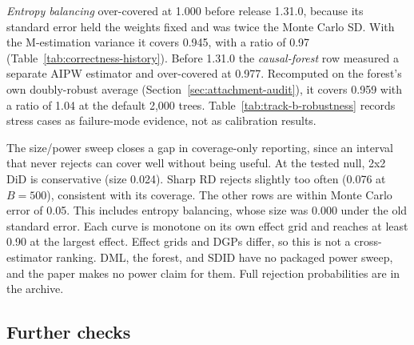 \begin{table}[!ht]
\centering\small
\begingroup\setlength{\tabcolsep}{4pt}

\endgroup
\caption{DML PLR on six designs with true coefficient 1, 500 draws each,
five folds:  with its default learner against
 with its default roster under short-stacking,
on the same data. Bias/SD is the bias in units of the Monte Carlo SD, and
SE/SD the mean reported standard error over that SD. The first row redraws
the design of Table~\ref{tab:track-b-b1000}.}
\label{tab:dml-designs}
\end{table}

\emph{Entropy balancing} over-covered at 1.000 before release 1.31.0,
because its standard error held the weights fixed and was twice the
Monte Carlo SD. With the M-estimation variance it covers 0.945, with
a ratio of 0.97 (Table~\ref{tab:correctness-history}). Before 1.31.0 the \emph{causal-forest}
row measured a separate AIPW estimator and over-covered at
0.977. Recomputed on the forest's own doubly-robust average
(Section~\ref{sec:attachment-audit}), it covers 0.959 with a ratio of
1.04 at the default 2{,}000 trees.
Table~\ref{tab:track-b-robustness} records stress cases as failure-mode
evidence, not as calibration results.



The size/power sweep closes a gap in coverage-only reporting, since an
interval that never rejects can cover well without being useful. At the
tested null, 2x2 DiD is conservative (size 0.024). Sharp RD rejects
slightly too often (0.076 at \(B=500\)), consistent with its coverage.
The other rows are within Monte Carlo error of 0.05. This includes
entropy balancing, whose size was 0.000 under the old standard error.
Each curve is monotone on its own effect grid and reaches at least 0.90
at the largest effect. Effect grids and DGPs differ, so this is not a
cross-estimator ranking. DML, the forest, and SDID have no packaged
power sweep, and the paper makes no power claim for them. Full rejection
probabilities are in the archive.

\subsection{Further checks}\label{sec:cross-estimator}\label{sec:high-n}

